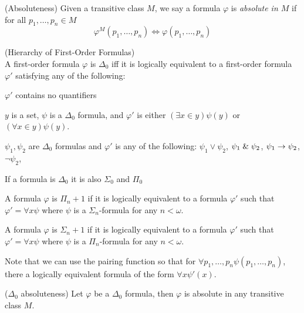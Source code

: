\begin{definition}{(Absoluteness)}
Given a transitive class $M$, we say a formula $\varphi$ is \emph{absolute in $M$} if for all $p_1, \ldots, p_n \in M$
\begin{equation}
\varphi^M(p_1, \ldots, p_n) \iff \varphi(p_1, \ldots, p_n)
\end{equation}
\end{definition}

\begin{definition}{(Hierarchy of First-Order Formulas)}\\
\bce[(I)]
A first-order formula $\varphi$ is $\Delta_0$ iff it is logically equivalent to a first-order formula $\varphi'$ satisfying any of the following:
\bce[(i)]
\item $\varphi'$ contains no quantifiers
\item $y$ is a set, $\psi$ is a $\Delta_0$ formula, and $\varphi'$ is either $(\exists x \in y)\psi(y)$ or $(\forall x \in y)\psi(y)$.
\item $\psi_1, \psi_2$ are $\Delta_0$ formulas and $\varphi'$ is any of the following: $\psi_1 \lor \psi_2$, $\psi_1 \mathrel{\&} \psi_2$, $\psi_1 \rightarrow \psi_2$, $\neg \psi_2$, 
\ece
\item If a formula is $\Delta_0$ it is also $\Sigma_0$ and $\Pi_0$
\item A formula $\varphi$ is $\Pi_n+1$ if it is logically equivalent to a formula $\varphi'$ such that $\varphi' = \forall x \psi$ where $\psi$ is a $\Sigma_n$-formula for any $n < \omega$.
\item A formula $\varphi$ is $\Sigma_n+1$ if it is logically equivalent to a formula $\varphi'$ such that $\varphi' = \forall x \psi$ where $\psi$ is a $\Pi_n$-formula for any $n < \omega$.
\ece
\end{definition}
Note that we can use the pairing function so that for $\forall p_1, \ldots, p_n \psi(p_1, \ldots, p_n)$, there a logically equivalent formula of the form $\forall x \psi'(x)$.

\begin{lemma}{($\Delta_0$ absoluteness)}\label{lemma:delta_0_absoluteness}
Let $\varphi$ be a $\Delta_0$ formula, then $\varphi$ is absolute in any transitive class $M$.
\end{lemma}

